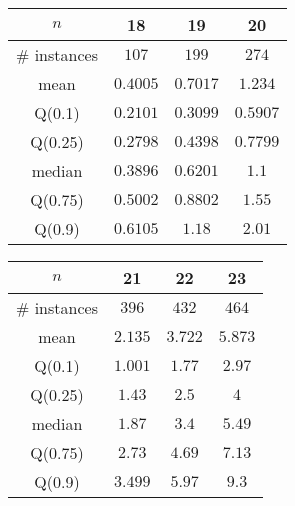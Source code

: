\begin{tabular}{c|ccc} 
\hline 
$n$ & 18 & 19 & 20 \tabularnewline 
\hline 
\hline 
\# instances & $107$ & $199$ & $274$ \tabularnewline 
mean & $0.4005$ & $0.7017$ & $1.234$ \tabularnewline 
Q(0.1) & $0.2101$ & $0.3099$ & $0.5907$ \tabularnewline 
Q(0.25) & $0.2798$ & $0.4398$ & $0.7799$ \tabularnewline 
median & $0.3896$ & $0.6201$ & $1.1$ \tabularnewline 
Q(0.75) & $0.5002$ & $0.8802$ & $1.55$ \tabularnewline 
Q(0.9) & $0.6105$ & $1.18$ & $2.01$ \tabularnewline 
\hline 
\end{tabular} 
\medskip{} 

\begin{tabular}{c|ccc} 
\hline 
$n$ & 21 & 22 & 23 \tabularnewline 
\hline 
\hline 
\# instances & $396$ & $432$ & $464$ \tabularnewline 
mean & $2.135$ & $3.722$ & $5.873$ \tabularnewline 
Q(0.1) & $1.001$ & $1.77$ & $2.97$ \tabularnewline 
Q(0.25) & $1.43$ & $2.5$ & $4$ \tabularnewline 
median & $1.87$ & $3.4$ & $5.49$ \tabularnewline 
Q(0.75) & $2.73$ & $4.69$ & $7.13$ \tabularnewline 
Q(0.9) & $3.499$ & $5.97$ & $9.3$ \tabularnewline 
\hline 
\end{tabular} 
\medskip{} 

